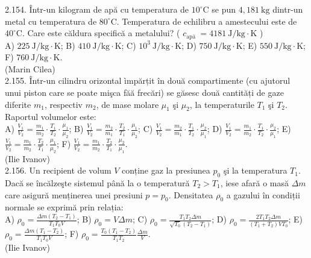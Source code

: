 2.154. Într-un kilogram de apă cu temperatura de $10^{\circ} \mathrm{C}$ se pun $4,181 \mathrm{~kg}$ dintr-un metal cu temperatura de $80^{\circ} \mathrm{C}$. Temperatura de echilibru a amestecului este de $40^{\circ} \mathrm{C}$. Care este căldura specifică a metalului? ( $c_{\text {apă }}=4181 \mathrm{~J} / \mathrm{kg} \cdot \mathrm{K}$ )\\ A) $225 \mathrm{~J} / \mathrm{kg} \cdot \mathrm{K}$; B) $410 \mathrm{~J} / \mathrm{kg} \cdot \mathrm{K}$; C) $10^{3} \mathrm{~J} / \mathrm{kg} \cdot \mathrm{K}$; D) $750 \mathrm{~J} / \mathrm{kg} \cdot \mathrm{K}$; E) $550 \mathrm{~J} / \mathrm{kg} \cdot \mathrm{K}$; F) $760 \mathrm{~J} / \mathrm{kg} \cdot \mathrm{K}$.\\ (Marin Cilea)\\

2.155. Într-un cilindru orizontal ìmpărțit în două compartimente (cu ajutorul unui piston care se poate mişca făă frecări) se găsesc două cantități de gaze diferite $m_{1}$, respectiv $m_{2}$, de mase molare $\mu_{1}$ şi $\mu_{2}$, la temperaturile $T_{1}$ şi $T_{2}$. Raportul volumelor este:\\ A) $\frac{V_{1}}{V_{2}}=\frac{m_{1}}{m_{2}} \cdot \frac{T_{1}}{T_{2}} \cdot \frac{\mu_{1}}{\mu_{2}}$; B) $\frac{V_{1}}{V_{2}}=\frac{m_{2}}{m_{1}} \cdot \frac{T_{2}}{T_{1}} \cdot \frac{\mu_{1}}{\mu_{2}}$; C) $\frac{V_{1}}{V_{2}}=\frac{m_{2}}{m_{1}} \cdot \frac{T_{1}}{T_{2}} \cdot \frac{\mu_{2}}{\mu_{1}}$; D) $\frac{V_{1}}{V_{2}}=\frac{m_{1}}{m_{2}} \cdot \frac{T_{1}}{T_{2}} \cdot \frac{\mu_{2}}{\mu_{1}}$; E) $\frac{V_{1}}{V_{2}}=\frac{m_{1}}{m_{2}} \cdot \frac{T_{2}}{T_{1}} \cdot \frac{\mu_{1}}{\mu_{2}}$; F) $\frac{V_{1}}{V_{2}}=\frac{m_{1}}{m_{2}} \cdot \frac{T_{2}}{T_{1}} \cdot \frac{\mu_{2}}{\mu_{1}}$.\\ (Ilie Ivanov)\\

2.156. Un recipient de volum $V$ conține gaz la presiunea $p_{0}$ şi la temperatura $T_{1}$. Dacă se încălzeşte sistemul până la o temperatură $T_{2}>T_{1}$, iese afară o masă $\Delta m$ care asigură menținerea unei presiuni $p=p_{0}$. Densitatea $\rho_{0}$ a gazului în condiții normale se exprimă prin relația:\\ A) $\rho_{0}=\frac{\Delta m\left(T_{2}-T_{1}\right)}{T_{1} T_{0} V}$; B) $\rho_{0}=V \Delta m$; C) $\rho_{0}=\frac{T_{1} T_{2} \Delta m}{\sqrt{T_{0}}\left(T_{2}-T_{1}\right)}$; D) $\rho_{0}=\frac{2 T_{1} T_{2} \Delta m}{\left(T_{1}+T_{2}\right) V T_{0}}$; E) $\rho_{0}=\frac{\Delta m\left(T_{1}-T_{2}\right)}{T_{1} T_{0} V}$; F) $\rho_{0}=\frac{T_{0}\left(T_{1}-T_{2}\right)}{T_{1} T_{2}} \frac{\Delta m}{V}$.\\ (Ilie Ivanov)\\

